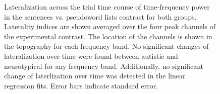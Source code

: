 \begin{figure}[!ht]
    \vspace{30pt}
	\centering
	\caption{Lateralization across the trial time course of time-frequency power in the sentences vs. pseudoword lists contrast for both groups. Laterality indices are shown averaged over the four peak channels of the experimental contrast. The location of the channels is shown in the topography for each frequency band. No significant changes of lateralization over time were found between autistic and neurotypical for any frequency band. Additionally, no significant change of laterlization over time was detected in the linear regression fits. Error bars indicate standard error. }
    \vspace*{-10pt}
	\label{fig:laterality-dynamics-peak}
\end{figure}


